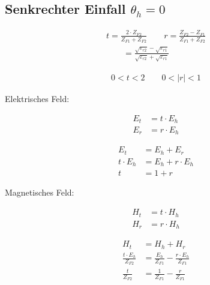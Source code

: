 \subsection{Senkrechter Einfall $ \theta_h = 0$ }



\begin{align*}
    t  = \frac{2 \cdot Z_{F2}}{Z_{F1} + Z_{F2}}\qquad r  = \frac{Z_{F2} - Z_{F1}}{Z_{F1} + Z_{F2}} \\
    \qquad = \frac{\sqrt{\varepsilon_{r2}}-\sqrt{\varepsilon_{r1}}}{\sqrt{\varepsilon_{r2}}+\sqrt{\varepsilon_{r1}}}
\end{align*}

\begin{align*}
    0<t<2 \qquad 0<|r|<1
\end{align*}

Elektrisches Feld:


\begin{align*}
    E_t & = t \cdot E_h \\
    E_r & = r \cdot E_h
\end{align*}

\begin{align*}
    E_t          & = E_h + E_r             \\
    t\cdot E_{h} & = E_{h} + r\cdot  E_{h} \\
    t            & = 1+ r
\end{align*}

Magnetisches Feld:


\begin{align*}
    H_t & = t \cdot H_h \\
    H_r & = r \cdot H_h
\end{align*}

\begin{align*}
    H_t                         & = H_h + H_r                                          \\
    \frac{t\cdot E_{h}}{Z_{F2}} & = \frac{E_{h}}{Z_{F1}} - \frac{r\cdot E_{h}}{Z_{F1}} \\
    \frac{t}{Z_{F2}}            & = \frac{1}{Z_{F1}} - \frac{r}{Z_{F1}}
\end{align*}





